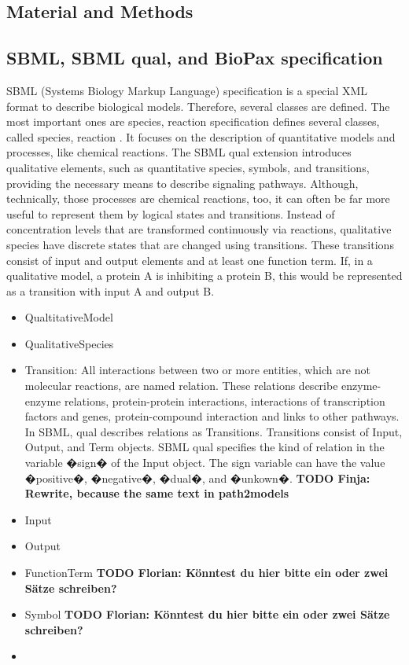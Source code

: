 \documentclass{bioinfo}
\begin{document}
\begin{methods}
\section{Material and Methods}
\subsection{SBML, SBML qual, and BioPax specification}
SBML (Systems Biology Markup Language) specification is a special XML format to describe biological models. Therefore, several classes are defined. The most important ones are species, reaction  specification defines several classes, called species, reaction \citep{Hucka2003}.
It focuses on the description of quantitative models and processes, like chemical reactions.
The SBML qual extension introduces qualitative elements, such as quantitative species, symbols, and transitions, providing the necessary means to describe signaling pathways.
Although, technically, those processes are chemical reactions, too, it can often be far more useful to represent them by logical states and transitions.
Instead of concentration levels that are transformed continuously via reactions, qualitative species have discrete states that are changed using transitions.
These transitions consist of input and output elements and at least one function term.
If, in a qualitative model, a protein A is inhibiting a protein B, this would be represented as a transition with input A and output B.

\begin{itemize}
\item QualtitativeModel
\item QualitativeSpecies
\item Transition: All interactions between two or more entities, which are not molecular reactions, are named relation. These relations describe enzyme-enzyme relations, protein-protein interactions, interactions of transcription factors and genes, protein-compound interaction and links to other pathways. In SBML, qual describes relations as Transitions. Transitions consist of Input, Output, and Term objects. SBML qual specifies the kind of relation in the variable �sign� of the Input object. The sign variable can have the value �positive�, �negative�, �dual�, and �unkown�. \textbf{TODO Finja: Rewrite, because the same text in path2models}
\item Input
\item Output
\item FunctionTerm \textbf{TODO Florian: K\"onntest du hier bitte ein oder zwei S\"atze schreiben?}
\item Symbol     \textbf{TODO Florian: K\"onntest du hier bitte ein oder zwei S\"atze schreiben?}
\item
\end{itemize}


\end{methods}
\end{document}
